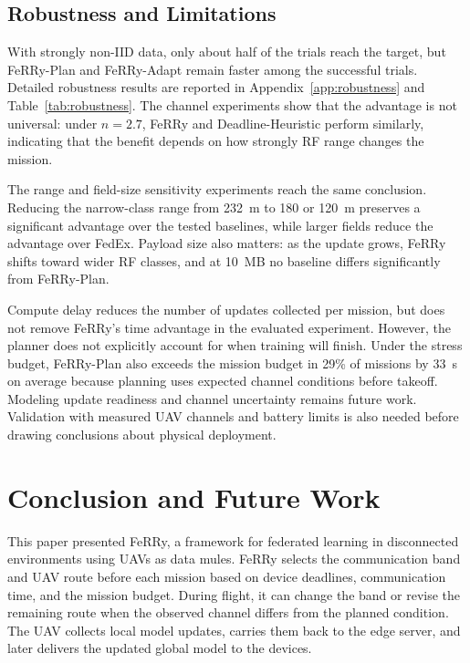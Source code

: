 \documentclass[conference]{IEEEtran}
\newcommand{\sysname}{FeRRy}
\begin{document}
\subsection{Robustness and Limitations}
\label{sec:robustness}
With strongly non-IID data, only about half of the trials reach the target, but
\sysname{}-Plan and \sysname{}-Adapt remain faster among the successful trials. Detailed robustness results are reported in
Appendix~\ref{app:robustness} and Table~\ref{tab:robustness}.
The channel experiments show that the advantage is not universal: under
\(n=2.7\), \sysname{} and Deadline-Heuristic perform similarly, indicating
that the benefit depends on how strongly RF range changes the mission.

The range and field-size sensitivity experiments reach the same conclusion.
Reducing the narrow-class range from 232~m to 180 or 120~m preserves a
significant advantage over the tested baselines, while larger fields reduce the
advantage over FedEx. Payload size also matters: as the update grows,
\sysname{} shifts toward wider RF classes, and at 10~MB no baseline differs
significantly from \sysname{}-Plan.

Compute delay reduces the number of updates collected per mission, but does not
remove \sysname{}'s time advantage in the evaluated experiment. However, the
planner does not explicitly account for when training will finish. Under the
stress budget, \sysname{}-Plan also exceeds the mission budget in 29\% of
missions by 33~s on average because planning uses expected channel conditions
before takeoff. Modeling update readiness and channel uncertainty remains
future work. Validation with measured UAV channels and battery limits is also
needed before drawing conclusions about physical deployment.
\section{Conclusion and Future Work}
\label{sec:conclusion}

This paper presented \sysname{}, a framework for federated learning in
disconnected environments using UAVs as data mules. \sysname{} selects the
communication band and UAV route before each mission based on device deadlines,
communication time, and the mission budget. During flight, it can change the
band or revise the remaining route when the observed channel differs from the
planned condition. The UAV collects local model updates, carries them back to
the edge server, and later delivers the updated global model to the devices.
\end{document}
